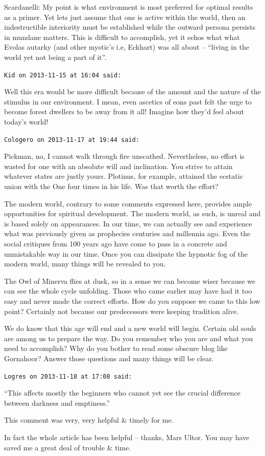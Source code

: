 \begin{footnotesize}
\begin{sffamily}
Scardanelli: My point is what environment is most preferred for optimal results as a primer. Yet lets just assume that one is active within the world, then an indestructible interiority must be established while the outward persona persists in mundane matters. This is difficult to accomplish, yet it echos what what Evolas autarky (and other mystic's i.e, Eckhart) was all about – “living in the world yet not being a part of it”.


\hfill

\texttt{Kid on 2013-11-15 at 16:04 said: }

Well this era would be more difficult because of the amount and the nature of the stimulus in our environment. I mean, even ascetics of eons past felt the urge to become forest dwellers to be away from it all! Imagine how they'd feel about today's world!


\hfill

\texttt{Cologero on 2013-11-17 at 19:44 said: }

Pickman, no, I cannot walk through fire unscathed. Nevertheless, no effort is wasted for one with an absolute will and inclination. You strive to attain whatever states are justly yours. Plotinus, for example, attained the ecstatic union with the One four times in his life. Was that worth the effort?

The modern world, contrary to some comments expressed here, provides ample opportunities for spiritual development. The modern world, as such, is unreal and is based solely on appearances. In our time, we can actually see and experience what was previously given as prophecies centuries and millennia ago. Even the social critiques from 100 years ago have come to pass in a concrete and unmistakable way in our time. Once you can dissipate the hypnotic fog of the modern world, many things will be revealed to you.

The Owl of Minerva flies at dusk, so in a sense we can become wiser because we can see the whole cycle unfolding. Those who came earlier may have had it too easy and never made the correct efforts. How do you suppose we came to this low point? Certainly not because our predecessors were keeping tradition alive.

We do know that this age will end and a new world will begin. Certain old souls are among us to prepare the way. Do you remember who you are and what you need to accomplish? Why do you bother to read some obscure blog like Gornahoor? Answer those questions and many things will be clear.


\hfill

\texttt{Logres on 2013-11-18 at 17:08 said: }

“This affects mostly the beginners who cannot yet see the crucial difference between darkness and emptiness.”

This comment was very, very helpful \& timely for me.

In fact the whole article has been helpful – thanks, Mars Ultor. You may have saved me a great deal of trouble \& time.


\end{sffamily}\end{footnotesize}
